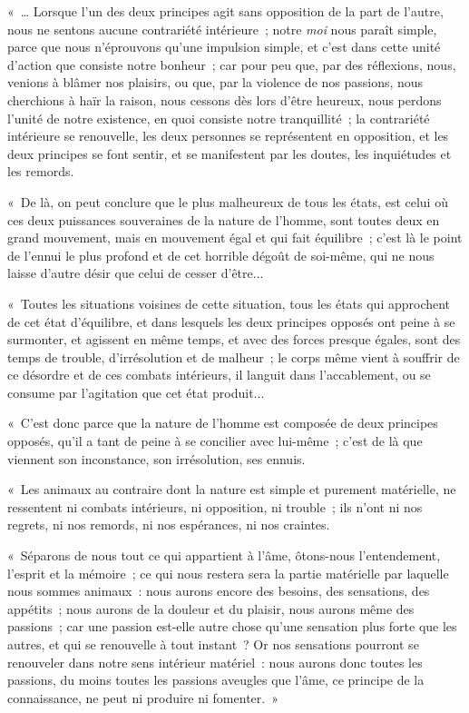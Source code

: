 \documentclass[french,twoside]{book} %
\begin{document}
« … Lorsque l’un des deux principes agit sans opposition de la part de l’autre, nous ne sentons aucune contrariété intérieure ; notre {\itshape moi} nous paraît simple, parce que nous n’éprouvons qu’une impulsion simple, et c’est dans cette unité d’action que consiste notre bonheur ; car pour peu que, par des réflexions, nous, venions à blâmer nos plaisirs, ou que, par la violence de nos passions, nous cherchions à haïr la raison, nous cessons dès lors d’être heureux, nous perdons l’unité de notre existence, en quoi consiste notre tranquillité ; la contrariété intérieure se renouvelle, les deux personnes se représentent en opposition, et les deux principes se font sentir, et se manifestent par les doutes, les inquiétudes et les remords.\par
« De là, on peut conclure que le plus malheureux de tous les états, est celui où ces deux puissances souveraines de la nature de l’homme, sont toutes deux en grand mouvement, mais en mouvement égal et qui fait équilibre ; c’est là le point de l’ennui le plus profond et de cet horrible dégoût de soi-même, qui ne nous laisse d’autre désir que celui de cesser d’être...\par
« Toutes les situations voisines de cette situation, tous les états qui approchent de cet état d’équilibre, et dans lesquels les deux principes opposés ont peine à se surmonter, et agissent en même temps, et avec des forces presque égales, sont des temps de trouble, d’irrésolution et de malheur ; le corps même vient à souffrir de ce désordre et de ces combats intérieurs, il languit dans l’accablement, ou se consume par l’agitation que cet état produit...\par
« C’est donc parce que la nature de l’homme est composée de deux principes opposés, qu’il a tant de peine à se concilier avec lui-même ; c’est de là que viennent son inconstance, son irrésolution, ses ennuis.\par
« Les animaux au contraire dont la nature est simple et purement matérielle, ne ressentent ni combats intérieurs, ni opposition, ni trouble ; ils n’ont ni nos regrets, ni nos remords, ni nos espérances, ni nos craintes.\par
« Séparons de nous tout ce qui appartient à l’âme, ôtons-nous l’entendement, l’esprit et la mémoire ; ce qui nous restera sera la partie matérielle par laquelle nous sommes animaux : nous aurons encore des besoins, des sensations, des appétits ; nous aurons de la douleur et du plaisir, nous aurons même des passions ; car une passion est-elle autre chose qu’une sensation plus forte que les autres, et qui se renouvelle à tout instant ? Or nos sensations pourront se renouveler dans notre sens intérieur matériel : nous aurons donc toutes les passions, du moins toutes les passions aveugles que l’âme, ce principe de la connaissance, ne peut ni produire ni fomenter. »\par
\end{document}
